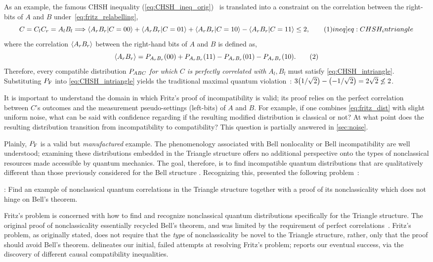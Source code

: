 \documentclass[aps, 10pt, english, twoside, pra, nofootinbib, tightenlines, longbibliography, superscriptaddress]{revtex4-1}
\begin{document}
    As an example, the famous CHSH inequality (\cref{eq:CHSH_ineq_orig})~\cite{CHSH_Original} is translated into a constraint on the correlation between the right-bits of $A$ and $B$ under~\cref{eq:fritz_relabelling},
    \[ C = C_{l}C_{r} = A_{l}B_{l} \Longrightarrow \ba{A_r B_r|C = 00} + \ba{A_r B_r|C = 01} + \ba{A_r B_r|C = 10} - \ba{A_r B_r|C = 11} \leq 2, \eq \label[ineq]{eq:CHSH_intriangle} \]
    where the correlation $\ba{A_r B_r}$ between the right-hand bits of $A$ and $B$ is defined as,
    \[ \ba{A_r B_r} = \prob[A_r B_r][00] + \prob[A_r B_r][11] - \prob[A_r B_r][01] - \prob[A_r B_r][10]. \eq \label{eq:right_bit_correlations} \]
    Therefore, every compatible distribution $\prob[ABC]$ \emph{for which $C$ is perfectly correlated with $A_l,B_l$} must satisfy \cref{eq:CHSH_intriangle}. Substituting $\prob[\fritz]$ into \cref{eq:CHSH_intriangle} yields the traditional maximal quantum violation~\cite{Cirelson_1980}: $3 \br{1/\sqrt{2}} - \br{-1/\sqrt{2}} = 2\sqrt{2} \not \leq 2$.

    It is important to understand the domain in which Fritz's proof of incompatibility is valid; its proof relies on the perfect correlation between $C$'s outcomes and the measurement pseudo-settings (left-bits) of $A$ and $B$. For example, if one combines \cref{eq:fritz_dist} with slight uniform noise, what can be said with confidence regarding if the resulting modified distribution is classical or not? At what point does the resulting distribution transition from incompatibility to compatibility? This question is partially answered in \cref{sec:noise}.

    Plainly, $\prob[\fritz]$ is a valid but \textit{manufactured} example. The phenomenology associated with Bell nonlocality or Bell incompatibility are well understood; examining these distributions embedded in the Triangle structure offers no additional perspective onto the types of nonclassical resources made accessible by quantum mechanics. The goal, therefore, is to find incompatible quantum distributions that are qualitatively different than those previously considered for the Bell structure \cite{Gisin_2017}. Recognizing this, \citet{Fritz_2012} presented the following problem~\cite[Problem 2.17]{Fritz_2012}:

    : Find an example of nonclassical quantum correlations in the Triangle structure together with a proof of its nonclassicality which does not hinge on Bell’s theorem.

    Fritz's problem is concerned with how to find and recognize nonclassical quantum distributions specifically for the Triangle structure. The original proof of nonclassicality essentially recycled Bell's theorem, and was limited by the requirement of perfect correlations~\cite{Fritz_2012}. Fritz's problem, as originally stated, does not require that the \emph{type} of nonclassicality be novel to the Triangle structure, rather, only that the proof should avoid Bell's theorem.  delineates our initial, failed attempts at resolving Fritz's problem;  reports our eventual success, via the discovery of different causal compatibility inequalities.
\end{document}
